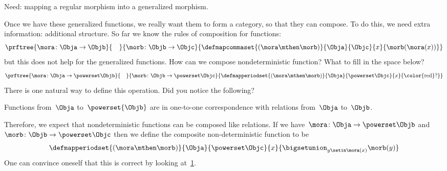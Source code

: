 Need: mapping a regular morphism into a generalized morphism.

Once we have these generalized functions, we really want them to form a category, so that they can compose.
To do this, we need extra information: additional structure.
So far we know the rules of composition for functions:
%
\begin{equation}
    \label{eq:monad-function-composition}
    \prftree{\mora\colon \Obja \to \Objb}{\quad}{\morb\colon \Objb \to \Objc}
    {
        \defmapcommaset{
            (\mora\mthen\morb)
        }{
            \Obja
        }{
            \Objc
        }{
            x
        }{
            \morb(\mora(x))
        }
    }
\end{equation}
%
but this does not help for the generalized functions.
How can we compose nondeterministic function?
What to fill in the space below?
%
\begin{equation}
    \label{eq:monad-gen-function-composition}
    \prftree{
        \mora\colon \Obja \to \powerset\Objb
    }{
        \quad
    }{
        \morb\colon \Objb \to \powerset \Objc
    }{
        \defmapperiodset{(\mora\mthen\morb)}{\Obja}{\powerset\Objc}%
        {x}{\text{\color{red}?}}
    }
\end{equation}
%
There is one natural way to define this operation.
Did you notice the following?

\begin{lemma}
    \label{lem:powersets-relations}
    Functions from~$\Obja$ to~$\powerset{\Objb}$ are in one-to-one correspondence with relations from~$\Obja$ to~$\Objb$.
\end{lemma}


Therefore, we expect that nondeterministic functions can be composed like relations.
If we have~$\mora\colon \Obja \to \powerset\Objb$ and~$\morb\colon \Objb \to \powerset \Objc$ then we define the composite non-deterministic function to be
%
\begin{equation}
    \label{eq:fish-nondet}
    \defmapperiodset{(\mora\mthen\morb)}{\Obja}{\powerset\Objc}%
    {x}{ \displaystyle \bigsetunion_{y\setin \mora(x)}\morb(y)}
\end{equation}
%
One can convince oneself that this is correct by looking at~\cref{fig:mapping-nondeterministic}.

\begin{figure}[h]
    \caption{}
    \label{fig:mapping-nondeterministic}
\end{figure}

